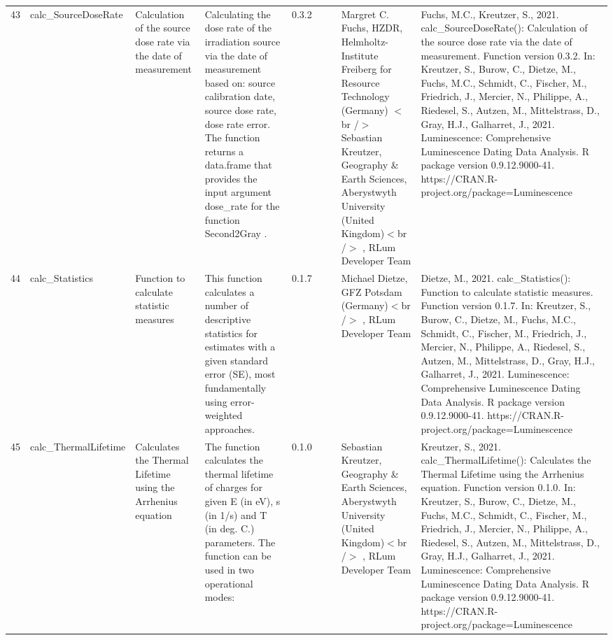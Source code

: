 \begin{table}[ht]
\begin{tabular}{rllllllll}
 \\ 
  43 & calc\_SourceDoseRate & Calculation of the source dose rate via the date of measurement & Calculating the dose rate of the irradiation source via the date of measurement based on: source calibration date, source dose rate, dose rate error. The function returns a data.frame that provides the input argument dose\_rate for the function  Second2Gray . & 0.3.2
 &  &  & Margret C. Fuchs, HZDR, Helmholtz-Institute Freiberg for Resource Technology (Germany)  $<$br /$>$ Sebastian Kreutzer, Geography \& Earth Sciences, Aberystwyth University (United Kingdom)$<$br /$>$ , RLum Developer Team & Fuchs, M.C., Kreutzer, S., 2021. calc\_SourceDoseRate(): Calculation of the source dose rate via the date of measurement. Function version 0.3.2. In: Kreutzer, S., Burow, C., Dietze, M., Fuchs, M.C., Schmidt, C., Fischer, M., Friedrich, J., Mercier, N., Philippe, A., Riedesel, S., Autzen, M., Mittelstrass, D., Gray, H.J., Galharret, J., 2021. Luminescence: Comprehensive Luminescence Dating Data Analysis. R package version 0.9.12.9000-41. https://CRAN.R-project.org/package=Luminescence
 \\ 
  44 & calc\_Statistics & Function to calculate statistic measures & This function calculates a number of descriptive statistics for estimates with a given standard error (SE), most fundamentally using error-weighted approaches. & 0.1.7
 &  &  & Michael Dietze, GFZ Potsdam (Germany)$<$br /$>$ , RLum Developer Team & Dietze, M., 2021. calc\_Statistics(): Function to calculate statistic measures. Function version 0.1.7. In: Kreutzer, S., Burow, C., Dietze, M., Fuchs, M.C., Schmidt, C., Fischer, M., Friedrich, J., Mercier, N., Philippe, A., Riedesel, S., Autzen, M., Mittelstrass, D., Gray, H.J., Galharret, J., 2021. Luminescence: Comprehensive Luminescence Dating Data Analysis. R package version 0.9.12.9000-41. https://CRAN.R-project.org/package=Luminescence
 \\ 
  45 & calc\_ThermalLifetime & Calculates the Thermal Lifetime using the Arrhenius equation & The function calculates the thermal lifetime of charges for given E (in eV), s (in 1/s) and T (in deg. C.) parameters. The function can be used in two operational modes: & 0.1.0
 &  &  & Sebastian Kreutzer, Geography \& Earth Sciences, Aberystwyth University (United Kingdom)$<$br /$>$ , RLum Developer Team & Kreutzer, S., 2021. calc\_ThermalLifetime(): Calculates the Thermal Lifetime using the Arrhenius equation. Function version 0.1.0. In: Kreutzer, S., Burow, C., Dietze, M., Fuchs, M.C., Schmidt, C., Fischer, M., Friedrich, J., Mercier, N., Philippe, A., Riedesel, S., Autzen, M., Mittelstrass, D., Gray, H.J., Galharret, J., 2021. Luminescence: Comprehensive Luminescence Dating Data Analysis. R package version 0.9.12.9000-41. https://CRAN.R-project.org/package=Luminescence

\end{tabular}
\end{table}
